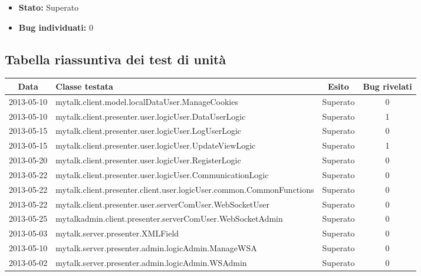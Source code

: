 {{\begin{itemize}
\begin{itemize}
\begin{itemize}
					\end{itemize}
					\item[] \textbf{Stato:} Superato

					\item[] \textbf{Bug individuati:} 0
				\end{itemize}	
			\end{itemize}

		}

\newpage
	\subsection{Tabella riassuntiva dei test di unità}{
		\begin{table}[h!]
			\scriptsize
			\begin{center}
				\begin{tabular}{c l c c}				
					\toprule
					Data 	   & Classe testata 											& Esito 	& Bug rivelati \\ 
					\midrule
					2013-05-10 & mytalk.client.model.localDataUser.ManageCookies 		 	 & Superato & 0 \\ 
					2013-05-10 & mytalk.client.presenter.user.logicUser.DataUserLogic 		 & Superato & 1 \\ 
					2013-05-15 & mytalk.client.presenter.user.logicUser.LogUserLogic 		 & Superato & 0 \\ 
					2013-05-15 & mytalk.client.presenter.user.logicUser.UpdateViewLogic 	 	& Superato & 1 \\ 
					2013-05-20 & mytalk.client.presenter.user.logicUser.RegisterLogic 		 & Superato & 0 \\									
					2013-05-22 & mytalk.client.presenter.user.logicUser.CommunicationLogic	 	& Superato & 0 \\
					2013-05-22 & mytalk.client.presenter.client.user.logicUser.common.CommonFunctions	 & Superato & 0 \\
					2013-05-22 & mytalk.client.presenter.user.serverComUser.WebSocketUser	 	& Superato & 0 \\	
					2013-05-25 & mytalkadmin.client.presenter.serverComUser.WebSocketAdmin	 	& Superato & 0 \\
					2013-05-03 & mytalk.server.presenter.XMLField & Superato & 0 \\
					2013-05-10 & mytalk.server.presenter.admin.logicAdmin.ManageWSA & Superato & 0 \\
					2013-05-02 &  mytalk.server.presenter.admin.logicAdmin.WSAdmin & Superato & 0 \\

\end{tabular}
\end{center}
\end{table}}}
